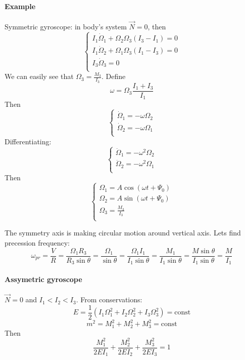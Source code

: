\paragraph{Example}
Symmetric gyroscope: in body's system $\vec{N} = 0$, then
$$\begin{cases}
I_1 \dot{\Omega}_1 + \Omega_2 \Omega_3 (I_3-I_1) = 0\\
I_1 \dot{\Omega}_2 + \Omega_1 \Omega_3 (I_1-I_3) = 0\\
I_3 \dot{\Omega}_3  = 0\\
\end{cases}$$
We can easily see that
$\Omega_3 = \frac{M_3}{I_3}$. Define
$$\omega = \Omega_3 \frac{I_1+I_3}{I_1}$$
Then
$$\begin{cases}
\dot{\Omega}_1 = -\omega \Omega_2\\
\dot{\Omega}_2 = -\omega \Omega_1\\
\end{cases}$$
Differentiating:
$$\begin{cases}
\ddot{\Omega}_1 = -\omega^2 \Omega_2\\
\ddot{\Omega}_2 = -\omega^2 \Omega_1\\
\end{cases}$$
Then
$$\begin{cases}
\Omega_1  =  A \cos \left( \omega t+ \Psi_0  \right)\\
\Omega_2  =   A \sin \left( \omega t+ \Psi_0  \right)\\
\Omega_3  =  \frac{M_3}{I_3}\\
\end{cases}$$

The symmetry axis is making circular motion around vertical axis. Lets find precession frequency:
$$\omega_{pr} = \frac{V}{R} = \frac{\Omega_1R_3}{R_3 \sin \theta}  = \frac{\Omega_1}{\sin \theta}  = \frac{\Omega_1I_1}{I_1\sin \theta} = \frac{M_1}{I_1\sin \theta} = \frac{M\sin \theta}{I_1\sin \theta} = \frac{M}{I_1}$$
\paragraph{Assymetric gyroscope}
$\vec{N}= 0$ and $I_1 < I_2 < I_3$. From conservations:
$$E = \frac{1}{2} \left( I_1\Omega_1^2 + I_2 \Omega_2^2 + I_3\Omega_3^2 \right) = \text{const}$$
$$m^2 = M_1^2+M_2^2+M_3^2 = \text{const}$$
Then
$$\frac{M_1^2}{2EI_1}+\frac{M_2^2}{2EI_2}+\frac{M_3^2}{2EI_3} = 1$$

